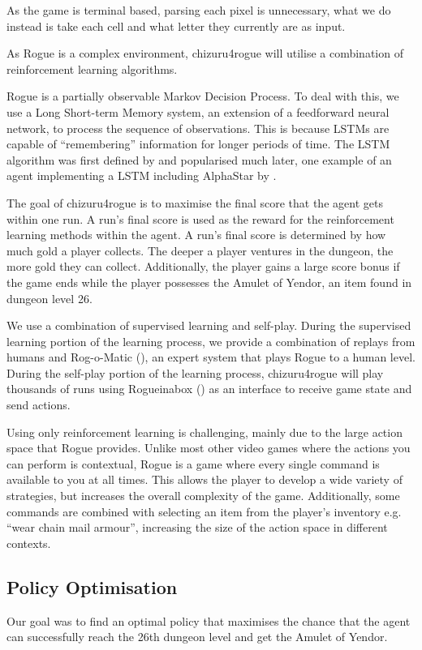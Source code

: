 \documentclass[11pt,a4paper]{article}
\begin{document}
As the game is terminal based, parsing each pixel is unnecessary, what we do instead is take each cell and what letter they currently are as input.

As Rogue is a complex environment, chizuru4rogue will utilise a combination of reinforcement learning algorithms.

Rogue is a partially observable Markov Decision Process. To deal with this, we use a Long Short-term Memory system, an extension of a feedforward neural network, to process the sequence of observations. This is because LSTMs are capable of ``remembering'' information for longer periods of time. The LSTM algorithm was first defined by \cite{hochreiter97} and popularised much later, one example of an agent implementing a LSTM including AlphaStar by \cite{vinyals19}.

The goal of chizuru4rogue is to maximise the final score that the agent gets within one run. A run's final score is used as the reward for the reinforcement learning methods within the agent. A run's final score is determined by how much gold a player collects. The deeper a player ventures in the dungeon, the more gold they can collect. Additionally, the player gains a large score bonus if the game ends while the player possesses the Amulet of Yendor, an item found in dungeon level 26.

We use a combination of supervised learning and self-play. During the supervised learning portion of the learning process, we provide a combination of replays from humans and Rog-o-Matic (\cite{mauldin83}), an expert system that plays Rogue to a human level. During the self-play portion of the learning process, chizuru4rogue will play thousands of runs using Rogueinabox (\cite{asperti17}) as an interface to receive game state and send actions.

Using only reinforcement learning is challenging, mainly due to the large action space that Rogue provides. Unlike most other video games where the actions you can perform is contextual, Rogue is a game where every single command is available to you at all times. This allows the player to develop a wide variety of strategies, but increases the overall complexity of the game. Additionally, some commands are combined with selecting an item from the player's inventory e.g. ``wear chain mail armour'', increasing the size of the action space in different contexts.



\subsection{Policy Optimisation}
Our goal was to find an optimal policy that maximises the chance that the agent can successfully reach the 26th dungeon level and get the Amulet of Yendor.
\end{document}
